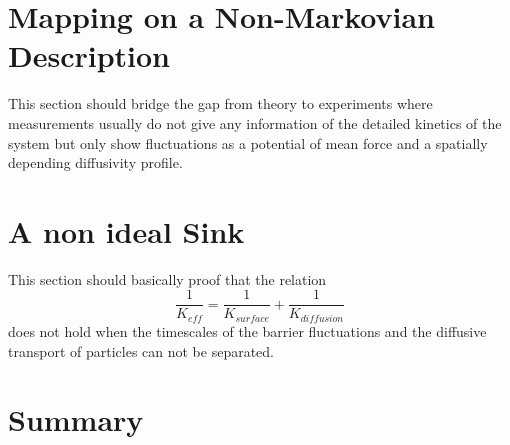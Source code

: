 \section{Mapping on a Non-Markovian Description}
This section should bridge the gap from theory to experiments where measurements usually do not give any information of the detailed kinetics of the system but only show fluctuations as a potential of mean force and a spatially depending diffusivity profile.

\newpage
\section{A non ideal Sink}
This section should basically proof that the relation
\begin{equation}
    \frac{1}{K_{eff}} = \frac{1}{K_{surface}}+\frac{1}{K_{diffusion}}
    \label{addition_of_rates}
\end{equation}
does not hold when the timescales of the barrier fluctuations and the diffusive transport of particles can not be separated.


\newpage
\section{Summary}
